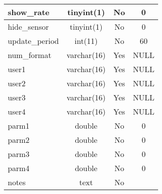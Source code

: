 \begin{longtable}{|l|c|c|c|}
show\_rate & tinyint(1) & No & 0 \\ \hline 
hide\_sensor & tinyint(1) & No & 0 \\ \hline 
update\_period & int(11) & No & 60 \\ \hline 
num\_format & varchar(16) & Yes & NULL \\ \hline 
user1 & varchar(16) & Yes & NULL \\ \hline 
user2 & varchar(16) & Yes & NULL \\ \hline 
user3 & varchar(16) & Yes & NULL \\ \hline 
user4 & varchar(16) & Yes & NULL \\ \hline 
parm1 & double & No & 0 \\ \hline 
parm2 & double & No & 0 \\ \hline 
parm3 & double & No & 0 \\ \hline 
parm4 & double & No & 0 \\ \hline 
notes & text & No &  \\ \hline 
 \end{longtable}

